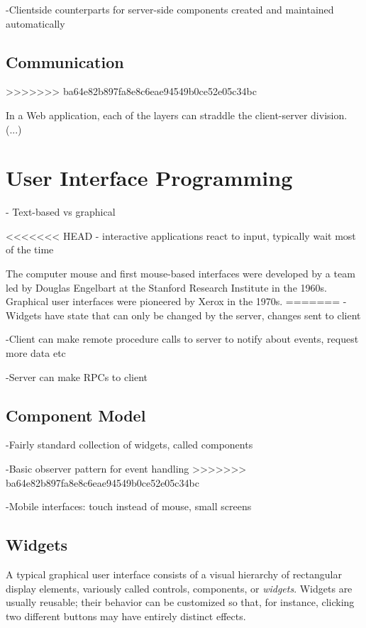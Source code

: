 -Clientside counterparts for server-side components created and maintained automatically

\subsection{Communication}
>>>>>>> ba64e82b897fa8e8c6eae94549b0ce52e05c34bc

In a Web application, each of the layers can straddle the client-server division. (...)

\section{User Interface Programming}

- Text-based vs graphical

<<<<<<< HEAD
- interactive applications react to input, typically wait most of the time

The computer mouse and first mouse-based interfaces were developed by a team led by Douglas Engelbart at the Stanford Research Institute in the \num{1960s}. Graphical user interfaces were pioneered by Xerox in the \num{1970s}.
=======
-Widgets have state that can only be changed by the server, changes sent to client

-Client can make remote procedure calls to server to notify about events, request more data etc

-Server can make RPCs to client

\subsection{Component Model}

-Fairly standard collection of widgets, called components

-Basic observer pattern for event handling
>>>>>>> ba64e82b897fa8e8c6eae94549b0ce52e05c34bc

-Mobile interfaces: touch instead of mouse, small screens

\subsection{Widgets}

A typical graphical user interface consists of a visual hierarchy of rectangular display elements, variously called controls, components, or \emph{widgets}. Widgets are usually reusable; their behavior can be customized so that, for instance, clicking two different buttons may have entirely distinct effects.

